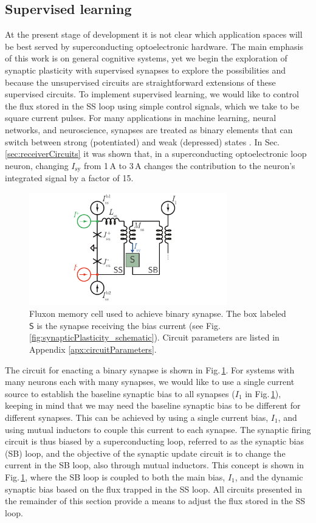 \documentclass[aip,amsmath,amssymb,reprint,nofootinbib]{revtex4-1}
\begin{document}
\subsection{\label{sec:supervised}Supervised learning}
At the present stage of development it is not clear which application spaces will be best served by superconducting optoelectronic hardware. The main emphasis of this work is on general cognitive systems, yet we begin the exploration of synaptic plasticity with supervised synapses to explore the possibilities and because the unsupervised circuits are straightforward extensions of these supervised circuits. To implement supervised learning, we would like to control the flux stored in the SS loop using simple control signals, which we take to be square current pulses. For many applications in machine learning, neural networks, and neuroscience, synapses are treated as binary elements that can switch between strong (potentiated) and weak (depressed) states \cite{amfu1994,fuab2007,lide2015}. In Sec.\,\ref{sec:receiverCircuits} it was shown that, in a superconducting optoelectronic loop neuron, changing $I_{\mathrm{sy}}$ from 1\,\textmu A to 3\,\textmu A changes the contribution to the neuron's integrated signal by a factor of 15. 
\begin{figure}[t!]
	\centerline{\includegraphics[width=8.6cm]{_synapticPlasticity_binaryCircuit_small.pdf}}
	\caption{\label{fig:synapticPlasticity_binaryCircuit}Fluxon memory cell used to achieve binary synapse. The box labeled $\mathsf{S}$ is the synapse receiving the bias current (see Fig.\,\ref{fig:synapticPlasticity_schematic}). Circuit parameters are listed in Appendix \ref{apx:circuitParameters}.}
\end{figure}
The circuit for enacting a binary synapse is shown in Fig.\,\ref{fig:synapticPlasticity_binaryCircuit}. For systems with many neurons each with many synapses, we would like to use a single current source to establish the baseline synaptic bias to all synapses ($I_1$ in Fig.\,\ref{fig:synapticPlasticity_binaryCircuit}), keeping in mind that we may need the baseline synaptic bias to be different for different synapses. This can be achieved by using a single current bias, $I_1$, and using mutual inductors to couple this current to each synapse. The synaptic firing circuit is thus biased by a superconducting loop, referred to as the synaptic bias (SB) loop, and the objective of the synaptic update circuit is to change the current in the SB loop, also through mutual inductors. This concept is shown in Fig.\,\ref{fig:synapticPlasticity_binaryCircuit}, where the SB loop is coupled to both the main bias, $I_1$, and the dynamic synaptic bias based on the flux trapped in the SS loop. All circuits presented in the remainder of this section provide a means to adjust the flux stored in the SS loop. 
\end{document}

